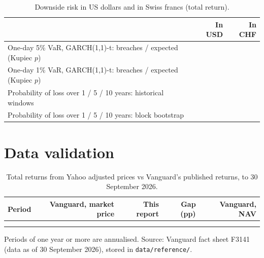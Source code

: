 \documentclass[11pt,a4paper]{article}
\newcommand{\keep}[1]{\Needspace{#1\baselineskip}}
\newcommand{\note}[1]{{\footnotesize\color{muted}#1\par}}
\begin{document}
\begin{table}[H]
\small
\caption{Downside risk in US dollars and in Swiss francs (total return).}
\begin{tabularx}{\linewidth}{L r r}
\toprule
 & \textbf{In USD} & \textbf{In CHF} \\
\midrule
One-day 5\% VaR, GARCH(1,1)-t: breaches / expected (Kupiec $p$) &  &  \\
One-day 1\% VaR, GARCH(1,1)-t: breaches / expected (Kupiec $p$) &  &  \\
Probability of loss over 1 / 5 / 10 years: historical windows &  &  \\
Probability of loss over 1 / 5 / 10 years: block bootstrap &  &  \\
\bottomrule
\end{tabularx}
\end{table}

\keep{24}
\section{Data validation}
\begin{table}[H]
\small
\caption{Total returns from Yahoo adjusted prices vs Vanguard's published returns, to 30 September 2026.}
\begin{tabularx}{\linewidth}{L r r r r}
\toprule
\textbf{Period} & \textbf{Vanguard, market price} & \textbf{This report} & \textbf{Gap (pp)} & \textbf{Vanguard, NAV} \\
\midrule
{}
 &  &  &  &  \\
\bottomrule
\end{tabularx}
\end{table}
\note{Periods of one year or more are annualised. Source: Vanguard fact sheet F3141 (data as of 30 September 2026), stored in \texttt{data/reference/}.}


\keep{20}
\end{document}
